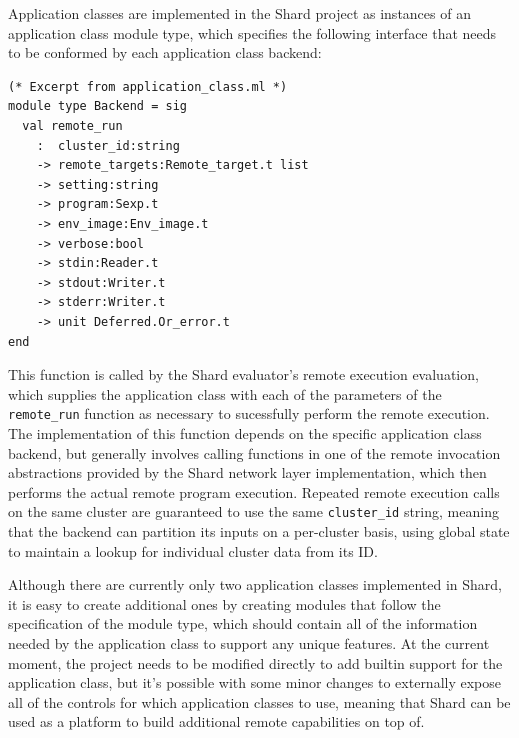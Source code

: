 \documentclass[twoside]{report}
\begin{document}

Application classes are implemented in the Shard project as instances of an application class module type, which specifies the following interface that needs to be conformed by each application class backend:

\begin{lstlisting}
(* Excerpt from application_class.ml *)
module type Backend = sig
  val remote_run
    :  cluster_id:string
    -> remote_targets:Remote_target.t list
    -> setting:string
    -> program:Sexp.t
    -> env_image:Env_image.t
    -> verbose:bool
    -> stdin:Reader.t
    -> stdout:Writer.t
    -> stderr:Writer.t
    -> unit Deferred.Or_error.t
end
\end{lstlisting}

This function is called by the Shard evaluator's remote execution evaluation, which supplies the application class with each of the parameters of the \texttt{remote\_run} function as necessary to sucessfully perform the remote execution.
The implementation of this function depends on the specific application class backend, but generally involves calling functions in one of the remote invocation abstractions provided by the Shard network layer implementation, which then performs the actual remote program execution.
Repeated remote execution calls on the same cluster are guaranteed to use the same \texttt{cluster\_id} string, meaning that the backend can partition its inputs on a per-cluster basis, using global state to maintain a lookup for individual cluster data from its ID.

Although there are currently only two application classes implemented in Shard, it is easy to create additional ones by creating modules that follow the specification of the module type, which should contain all of the information needed by the application class to support any unique features.
At the current moment, the project needs to be modified directly to add builtin support for the application class, but it's possible with some minor changes to externally expose all of the controls for which application classes to use, meaning that Shard can be used as a platform to build additional remote capabilities on top of.
\end{document}
